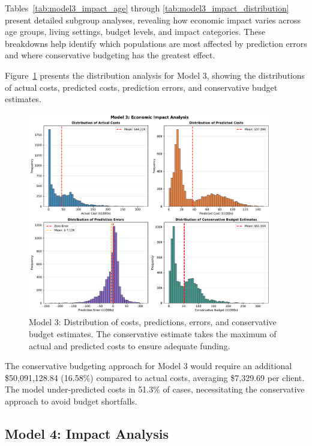 Tables~\ref{tab:model3_impact_age} through \ref{tab:model3_impact_distribution} present detailed subgroup analyses, revealing how economic impact varies across age groups, living settings, budget levels, and impact categories. These breakdowns help identify which populations are most affected by prediction errors and where conservative budgeting has the greatest effect.

Figure~\ref{fig:model3_impact_histograms} presents the distribution analysis for Model 3, showing the distributions of actual costs, predicted costs, prediction errors, and conservative budget estimates.

\begin{figure}[htbp]
\centering
\includegraphics[width=0.95\textwidth]{figures/model_3_Impact_Histograms.pdf}
\caption{Model 3: Distribution of costs, predictions, errors, and conservative budget estimates. The conservative estimate takes the maximum of actual and predicted costs to ensure adequate funding.}
\label{fig:model3_impact_histograms}
\end{figure}

The conservative budgeting approach for Model 3 would require an additional \$50,091,128.84 (16.58\%) compared to actual costs, averaging \$7,329.69 per client. The model under-predicted costs in 51.3\% of cases, necessitating the conservative approach to avoid budget shortfalls. 

\clearpage

\subsection{Model 4: Impact Analysis}
\label{subsec:model4_impact}

